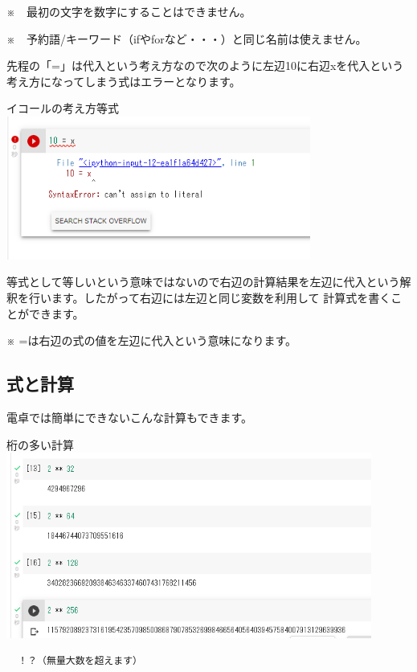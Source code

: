 \documentclass[11pt,a4paper,dvipdfmx,titlepage]{jsreport}
\begin{document}
\begin{description}

\item ※　最初の文字を数字にすることはできません。
\item ※　予約語/キーワード（ifやforなど・・・）と同じ名前は使えません。

\end{description}
 先程の「=」は代入という考え方なので次のように左辺10に右辺xを代入という考え方になってしまう式はエラーとなります。


\begin{grabox}{イコールの考え方等式}
\includegraphics[width=10cm]{images/colab08.png}
\end{grabox}
等式として等しいという意味ではないので右辺の計算結果を左辺に代入という解釈を行います。したがって右辺には左辺と同じ変数を利用して
計算式を書くことができます。

 ※ =は右辺の式の値を左辺に代入という意味になります。

\subsection{式と計算}
 電卓では簡単にできないこんな計算もできます。
\begin{grabox}{桁の多い計算}
\includegraphics[width=12cm]{images/colab09.png}
\begin{verbatim}
  ！？（無量大数を超えます）
\end{verbatim}
\end{grabox}
\end{document}
